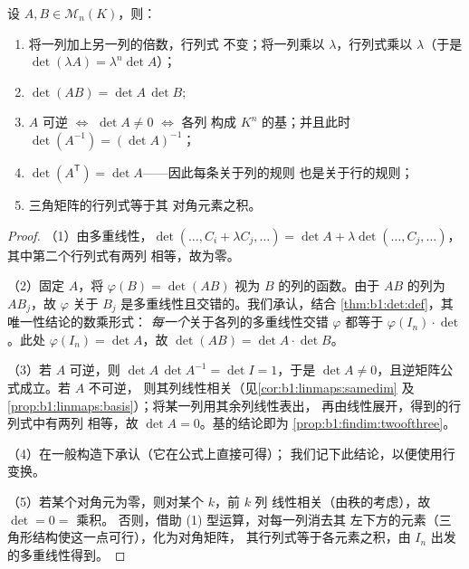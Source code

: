 \begin{theorem}[性质]\label{thm:b1:det:props}
设 $A, B \in \mathcal{M}_n(K)$，则：
\begin{enumerate}
  \item 将一列加上另一列的倍数，行列式
        不变；将一列乘以 $\lambda$，行列式乘以
        $\lambda$（于是 $\det(\lambda A) = \lambda^n \det A$）；
  \item $\det(AB) = \det A\, \det B$;
  \item $A$ 可逆 $\iff$ $\det A \neq 0$ $\iff$ 各列
        构成 $K^n$ 的基；并且此时 $\det(A^{-1}) = (\det
        A)^{-1}$；
  \item $\det(A^{\mathsf T}) = \det A$——因此每条关于列的规则
        也是关于行的规则；
  \item 三角矩阵的行列式等于其
        对角元素之积。
\end{enumerate}
\end{theorem}

\begin{proof}
（1）由多重线性，$\det(\dots, C_i + \lambda C_j, \dots) = \det A +
\lambda\det(\dots, C_j, \dots)$，其中第二个行列式有两列
相等，故为零。

（2）固定 $A$，将 $\varphi(B) = \det(AB)$ 视为
$B$ 的列的函数。由于 $AB$ 的列为 $AB_j$，故 $\varphi$
关于 $B_j$ 是多重线性且交错的。我们承认，结合
\cref{thm:b1:det:def}，其唯一性结论的数乘形式：
\emph{每一个}关于各列的多重线性交错 $\varphi$
都等于 $\varphi(I_n) \cdot \det$。此处 $\varphi(I_n) = \det A$，故
$\det(AB) = \det A \cdot \det B$。

（3）若 $A$ 可逆，则 $\det A\,\det A^{-1} = \det I = 1$，于是
$\det A \neq 0$，且逆矩阵公式成立。若 $A$ 不可逆，
则其列线性相关（见\cref{cor:b1:linmaps:samedim}
及\cref{prop:b1:linmaps:basis}）；将某一列用其余列线性表出，
再由线性展开，得到的行列式中有两列
相等，故 $\det A = 0$。基的结论即为
\cref{prop:b1:findim:twoofthree}。

（4）在一般构造下承认（它在公式上直接可得）；
我们记下此结论，以便使用行变换。

（5）若某个对角元为零，则对某个 $k$，前 $k$ 列
线性相关（由秩的考虑），故 $\det = 0 =$ 乘积。
否则，借助 (1) 型运算，对每一列消去其
左下方的元素（三角形结构使这一点可行），化为对角矩阵，
其行列式等于各元素之积，由
$I_n$ 出发的多重线性得到。
\end{proof}

